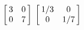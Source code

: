 {$\left[\hskip -3pt \begin{array}{cc} 3&0\\  0&7\end {array} \hskip -3pt
 \right] $
 }
{$\left[\hskip -3pt \begin{array}{cc} 1/3&0\\  0&1/7\end {array} \hskip -3pt
 \right]$ }
